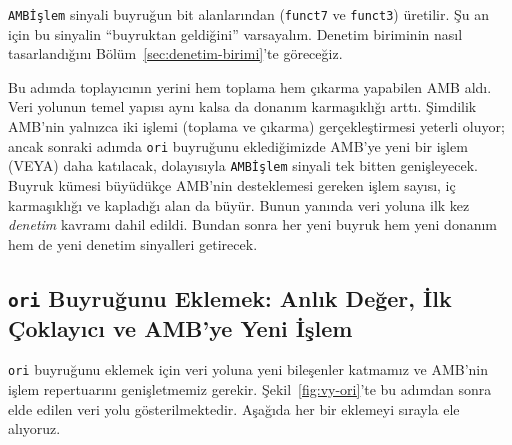 \texttt{AMBİşlem} sinyali buyruğun bit alanlarından (\texttt{funct7} ve \texttt{funct3}) üretilir. Şu an için bu sinyalin ``buyruktan geldiğini'' varsayalım. Denetim biriminin nasıl tasarlandığını Bölüm~\ref{sec:denetim-birimi}'te göreceğiz.

Bu adımda toplayıcının yerini hem toplama hem çıkarma yapabilen AMB aldı. Veri yolunun temel yapısı aynı kalsa da donanım karmaşıklığı arttı. Şimdilik AMB'nin yalnızca iki işlemi (toplama ve çıkarma) gerçekleştirmesi yeterli oluyor; ancak sonraki adımda \texttt{ori} buyruğunu eklediğimizde AMB'ye yeni bir işlem (VEYA) daha katılacak, dolayısıyla \texttt{AMBİşlem} sinyali tek bitten genişleyecek. Buyruk kümesi büyüdükçe AMB'nin desteklemesi gereken işlem sayısı, iç karmaşıklığı ve kapladığı alan da büyür. Bunun yanında veri yoluna ilk kez \emph{denetim} kavramı dahil edildi. Bundan sonra her yeni buyruk hem yeni donanım hem de yeni denetim sinyalleri getirecek.

\subsection{\texttt{ori} Buyruğunu Eklemek: Anlık Değer, İlk Çoklayıcı ve AMB'ye Yeni İşlem}
\label{subsec:vy-ori}

\texttt{ori} buyruğunu eklemek için veri yoluna yeni bileşenler katmamız ve AMB'nin işlem repertuarını genişletmemiz gerekir. Şekil~\ref{fig:vy-ori}'te bu adımdan sonra elde edilen veri yolu gösterilmektedir. Aşağıda her bir eklemeyi sırayla ele alıyoruz.

